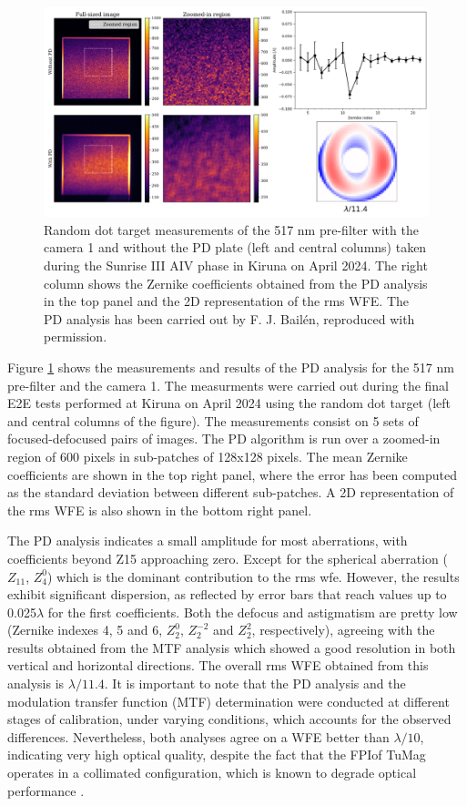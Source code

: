 \begin{figure}
    \includegraphics[width=\textwidth]{figures/TuMag/PD_e2e.pdf}
    \caption{Random dot target measurements of the 517 nm pre-filter with the camera 1 and without the PD plate (left and central columns) taken during the Sunrise III AIV phase in Kiruna on April 2024. The right column shows the Zernike coefficients obtained from the PD analysis in the top panel and the 2D representation of the rms WFE. The PD analysis has been carried out by F. J. Bailén, reproduced with permission.}
      \label{tumag : PD}
\end{figure}

Figure \ref{tumag : PD} shows the measurements and results of the PD analysis for the 517 nm pre-filter and the camera 1. The measurments were carried out during the final E2E tests performed at Kiruna on April 2024 using the random dot target (left and central columns of the figure). The measurements consist on 5 sets of focused-defocused pairs of images. The PD algorithm is run over a zoomed-in region of 600 pixels in sub-patches of 128x128 pixels. The mean Zernike coefficients are shown in the top right panel, where the error has been computed as the standard deviation between different sub-patches. A 2D representation of the rms WFE is also shown in the bottom right panel. 

The PD analysis indicates a small amplitude for most aberrations, with coefficients beyond Z15 approaching zero. Except for the spherical aberration ($Z_{11}$, $Z_4 ^0$) which is the dominant contribution to the rms wfe. However, the results exhibit significant dispersion, as reflected by error bars that reach values up to 0.025$\lambda$ for the first coefficients. Both the defocus and astigmatism are pretty low (Zernike indexes 4, 5 and 6, $Z _ 2 ^0$, $Z _ 2 ^{-2}$ and $Z _ 2 ^2$, respectively), agreeing with the results obtained from the MTF analysis which showed a good resolution in both vertical and horizontal directions. The overall rms WFE obtained from this analysis is $\lambda / 11.4$. It is important to note that the PD analysis and the modulation transfer function (MTF) determination were conducted at different stages of calibration, under varying conditions, which accounts for the observed differences. Nevertheless, both analyses agree on a WFE better than $\lambda / 10$, indicating very high optical quality, despite the fact that the FPIof TuMag operates in a collimated configuration, which is known to degrade optical performance \citep{ghosts-etalon}.

